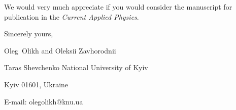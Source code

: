 \documentclass[preprint]{elsarticle}
\begin{document}
We would  very much appreciate if you would consider the manuscript for publication in the \emph{Current Applied Physics}.

%


\vspace{3mm}

Sincerely yours,

Oleg~Olikh and Oleksii Zavhorodnii


Taras Shevchenko National University of Kyiv


Kyiv 01601, Ukraine

E-mail: olegolikh@knu.ua
\end{document}
